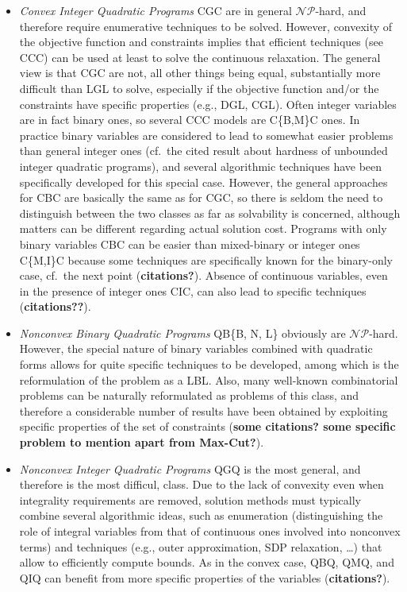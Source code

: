 \begin{itemize}
 \item \emph{Convex Integer Quadratic Programs} CGC are in general $\mathcal{NP}$-hard, and therefore require enumerative techniques to be solved. However, convexity of the objective function and constraints implies that efficient techniques (see CCC) can be used at least to solve the continuous relaxation. The general view is that CGC are not, all other things being equal,  substantially more difficult than LGL to solve, especially if the objective function and/or the constraints have specific properties (e.g., DGL, CGL). Often integer variables are in fact binary ones, so several CCC models are C\{B,M\}C ones. In practice binary variables are considered to lead to somewhat easier problems than general integer ones (cf.~the cited result about hardness of unbounded integer quadratic programs), and several algorithmic techniques have been specifically developed for this special case. However, the general approaches for CBC are basically the same as for CGC, so there is seldom the need to distinguish between the two classes as far as solvability is concerned, although matters can be different regarding actual solution cost. Programs with only binary variables CBC can be easier than mixed-binary or integer ones C\{M,I\}C because some techniques are specifically known for the binary-only case, cf.~the next point ({\bf citations?}). Absence of continuous variables, even in the presence of integer ones CIC, can also lead to specific techniques ({\bf citations??}).  
  \item \emph{Nonconvex Binary Quadratic Programs} QB\{B, N, L\} obviously are $\mathcal{NP}$-hard. However, the special nature of binary variables combined with quadratic forms allows for quite specific techniques to be developed, among which is the reformulation of the problem as a LBL. Also, many well-known combinatorial problems can be naturally reformulated as problems of this class, and therefore a considerable number of results have been obtained by exploiting specific properties of the set of constraints ({\bf some citations? some specific problem to mention apart from Max-Cut?}).
  \item \emph{Nonconvex Integer Quadratic Programs} QGQ is the most general, and therefore is the most difficul, class. Due to the lack of convexity even when integrality requirements are removed, solution methods must typically combine several algorithmic ideas, such as enumeration (distinguishing the role of integral variables from that of continuous ones involved into nonconvex terms) and techniques (e.g., outer approximation, SDP relaxation, \ldots) that allow to efficiently compute bounds. As in the convex case, QBQ, QMQ, and QIQ can benefit from more specific properties of the variables ({\bf citations?}).
\end{itemize}
